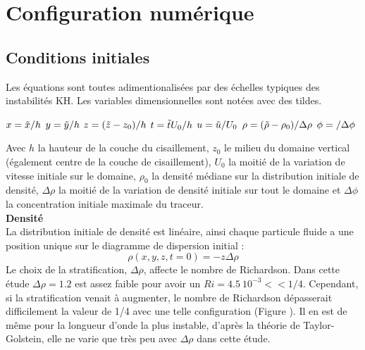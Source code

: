 \documentclass[a4paper,12pt]{article}
\begin{document}
\section{Configuration numérique}
    
    \subsection{Conditions initiales}
    
    Les équations sont toutes adimentionalisées par des échelles typiques des instabilités KH. Les variables dimensionnelles sont notées avec des tildes. 
    \begin{center}
       $x=\Tilde{x}/h$  \hspace{1cm}  $y=\Tilde{y}/h$  \hspace{1cm}   $z=(\Tilde{z}-z_0)/h$   \hspace{1cm}    $t=\Tilde{t}U_0/h$    \hspace{1cm}  $u=\Tilde{u}/U_{0}$    \hspace{1cm}   $\rho =( \Tilde{\rho}-\rho_0)/\Delta\rho$   \hspace{1cm}     $\phi=\title{\phi}/\Delta\phi$ \\ 
    \end{center}
    Avec $h$ la hauteur de la couche du cisaillement, $z_0$ le milieu du domaine vertical (également centre de la couche de cisaillement), $U_0$ la moitié de la variation de vitesse initiale sur le domaine, $\rho_0$ la densité médiane sur la distribution initiale de densité, $\Delta\rho$ la moitié de la variation de densité initiale sur tout le domaine et $\Delta\phi$ la concentration initiale maximale du traceur. \\
    \newline    
    \textbf{Densité} \\
    La distribution initiale de densité est linéaire, ainsi chaque particule fluide a une position unique sur le diagramme de dispersion initial :
    \begin{equation}
    \label{rho_ini}
        \rho(x,y,z,t=0)=-z\Delta\rho
    \end{equation}
    Le choix de la stratification, $\Delta\rho$, affecte le nombre de Richardson. Dans cette étude $\Delta\rho=1.2$ est assez faible pour avoir un $Ri=4.5\ 10^{-3}<< 1/4$. Cependant, si la stratification venait à augmenter, le nombre de Richardson dépasserait difficilement la valeur de 1/4 avec une telle configuration (Figure ). Il en est de même pour la longueur d'onde la plus instable,  d'après la théorie de Taylor-Golstein, elle ne varie que très peu avec $\Delta\rho$ dans cette étude. \\
\end{document}
